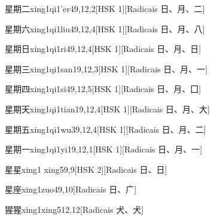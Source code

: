 \begin{entry}{星期二}{xing1qi1'er4}{9,12,2}[HSK 1][Radicais ⽇、⽉、⼆]
\end{entry}

\begin{entry}{星期六}{xing1qi1liu4}{9,12,4}[HSK 1][Radicais ⽇、⽉、⼋]
\end{entry}

\begin{entry}{星期日}{xing1qi1ri4}{9,12,4}[HSK 1][Radicais ⽇、⽉、⽇]
\end{entry}

\begin{entry}{星期三}{xing1qi1san1}{9,12,3}[HSK 1][Radicais ⽇、⽉、⼀]
\end{entry}

\begin{entry}{星期四}{xing1qi1si4}{9,12,5}[HSK 1][Radicais ⽇、⽉、⼞]
\end{entry}

\begin{entry}{星期天}{xing1qi1tian1}{9,12,4}[HSK 1][Radicais ⽇、⽉、⼤]
\end{entry}

\begin{entry}{星期五}{xing1qi1wu3}{9,12,4}[HSK 1][Radicais ⽇、⽉、⼆]
\end{entry}

\begin{entry}{星期一}{xing1qi1yi1}{9,12,1}[HSK 1][Radicais ⽇、⽉、⼀]
\end{entry}

\begin{entry}{星星}{xing1 xing5}{9,9}[HSK 2][Radicais ⽇、⽇]
\end{entry}

\begin{entry}{星座}{xing1zuo4}{9,10}[Radicais ⽇、⼴]
\end{entry}

\begin{entry}{猩猩}{xing1xing5}{12,12}[Radicais ⽝、⽝]
\end{entry}


